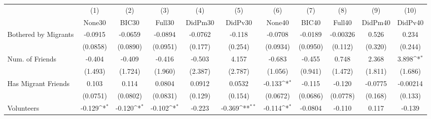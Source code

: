 {
\def\sym#1{\ifmmode^{#1}\else\(^{#1}\)\fi}
\begin{tabular}{l*{10}{c}}
\toprule
            &\multicolumn{1}{c}{(1)}&\multicolumn{1}{c}{(2)}&\multicolumn{1}{c}{(3)}&\multicolumn{1}{c}{(4)}&\multicolumn{1}{c}{(5)}&\multicolumn{1}{c}{(6)}&\multicolumn{1}{c}{(7)}&\multicolumn{1}{c}{(8)}&\multicolumn{1}{c}{(9)}&\multicolumn{1}{c}{(10)}\\
            &\multicolumn{1}{c}{None30}&\multicolumn{1}{c}{BIC30}&\multicolumn{1}{c}{Full30}&\multicolumn{1}{c}{DidPm30}&\multicolumn{1}{c}{DidPv30}&\multicolumn{1}{c}{None40}&\multicolumn{1}{c}{BIC40}&\multicolumn{1}{c}{Full40}&\multicolumn{1}{c}{DidPm40}&\multicolumn{1}{c}{DidPv40}\\
\midrule
Bothered by Migrants&     -0.0915         &     -0.0659         &     -0.0894         &     -0.0762         &      -0.118         &     -0.0708         &     -0.0189         &    -0.00326         &       0.526         &       0.234         \\
            &    (0.0858)         &    (0.0890)         &    (0.0951)         &     (0.177)         &     (0.254)         &    (0.0934)         &    (0.0950)         &     (0.112)         &     (0.320)         &     (0.244)         \\
\addlinespace
Num. of Friends&      -0.404         &      -0.409         &      -0.416         &      -0.503         &       4.157         &      -0.683         &      -0.455         &       0.748         &       2.368         &       3.898\sym{*}  \\
            &     (1.493)         &     (1.724)         &     (1.960)         &     (2.387)         &     (2.787)         &     (1.056)         &     (0.941)         &     (1.472)         &     (1.811)         &     (1.686)         \\
\addlinespace
Has Migrant Friends&       0.103         &       0.114         &      0.0804         &      0.0912         &      0.0532         &      -0.133\sym{*}  &      -0.115         &      -0.120         &     -0.0775         &    -0.00214         \\
            &    (0.0751)         &    (0.0802)         &    (0.0831)         &     (0.129)         &     (0.154)         &    (0.0672)         &    (0.0686)         &    (0.0778)         &     (0.168)         &     (0.133)         \\
\addlinespace
Volunteers  &      -0.129\sym{*}  &      -0.120\sym{*}  &      -0.102\sym{*}  &      -0.223         &      -0.369\sym{**} &      -0.114\sym{*}  &     -0.0804         &      -0.110         &       0.117         &      -0.139         \\

\end{tabular}}
